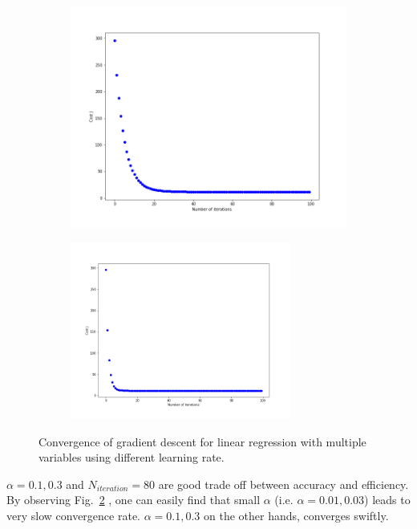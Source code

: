 \documentclass[english,11pt]{article}
\begin{document}
\begin{figure}[H]
\centering
\begin{subfigure}{.5\textwidth}
\centering
\includegraphics[width=.8\linewidth]{../hw1/part1/3_1_B5_lr0_1.png}
\end{subfigure}%
\begin{subfigure}{.5\textwidth}
\centering
\includegraphics[width=0.8\textwidth]{../hw1/part1/3_1_B5_lr0_3}
\label{fig:converg_lr}
\end{subfigure}

\caption{Convergence of gradient descent for linear regression with multiple variables using different learning rate.}
\end{figure}

$\alpha = 0.1, 0.3$ and $N_{iteration} = 80$ are good trade off between accuracy and efficiency. By observing Fig.~\ref{fig:converg_lr} , one can easily find that small $\alpha$ (i.e. $\alpha= 0.01, 0.03$) leads to very slow convergence rate. $\alpha =0.1,0.3$ on the other hands, converges swiftly.
\end{document}
